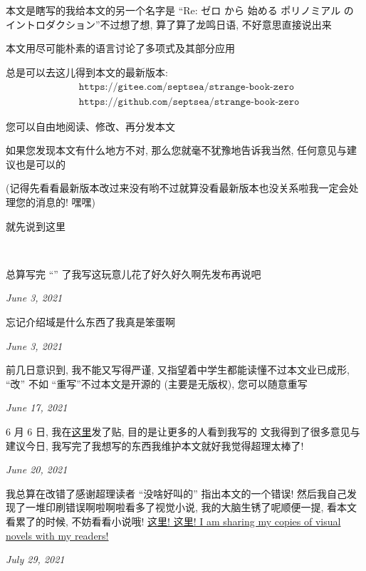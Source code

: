 \section*{\Preface}

本文是瞎写的\period 我给本文的另一个名字是 ``Re: ゼロ から 始める ポリノミアル の イントロダクション''\period 不过想了想, 算了算了\period 龙鸣日语, 不好意思直接说出来\period

本文用尽可能朴素的语言讨论了多项式及其部分应用\period

总是可以去这儿得到本文的最新版本:
\begin{align*}
     & \texttt{https://gitee.com/septsea/strange-book-zero}  \\
     & \texttt{https://github.com/septsea/strange-book-zero}
\end{align*}

您可以自由地阅读、修改、再分发本文\period

如果您发现本文有什么地方不对, 那么您就毫不犹豫地告诉我\period 当然, 任何意见与建议也是可以的\period

(记得先看看最新版本改过来没有哟\period 不过就算没看最新版本也没关系啦\period 我一定会处理您的消息的! 嘿嘿\period)

就先说到这里\period

\ \

\providecommand{\appendDate}{}
\renewcommand{\appendDate}[1]{\par \hfill {\itshape \sffamily #1}}

\begin{remark}
    总算写完 ``\Prerequisites '' 了\period 我写这玩意儿花了好久好久啊\period 先发布再说吧\period
    \appendDate{June 3, 2021}
\end{remark}

\begin{remark}
    忘记介绍域是什么东西了\period 我真是笨蛋啊\period
    \appendDate{June 3, 2021}
\end{remark}

\begin{remark}
    前几日意识到, 我不能又写得严谨, 又指望着中学生都能读懂\period 不过本文业已成形, ``改'' 不如 ``重写''\period 不过本文是开源的 (主要是无版权), 您可以随意重写\period
    \appendDate{June 17, 2021}
\end{remark}

\begin{remark}
    6 月 6 日, 我在\hyperref{https://chaoli.club/index.php/6396}{}{}{这里}发了贴, 目的是让更多的人看到我写的  文\period 我得到了很多意见与建议\period 今日, 我写完了我想写的东西\period 我维护本文就好\period 我觉得超理太棒了!
    \appendDate{June 20, 2021}
\end{remark}

\begin{remark}
    我总算在改错了\period 感谢超理读者 ``没啥好叫的'' 指出本文的一个错误! 然后我自己发现了一堆印刷错误\period 啊啦啊啦\period 看多了视觉小说, 我的大脑生锈了呢\period 顺便一提, 看本文看累了的时候, 不妨看看小说哦! \hyperref{https://gitee.com/septsea/ss}{}{}{这里! 这里! I am sharing my copies of visual novels with my readers!}
    \appendDate{July 29, 2021}
\end{remark}
